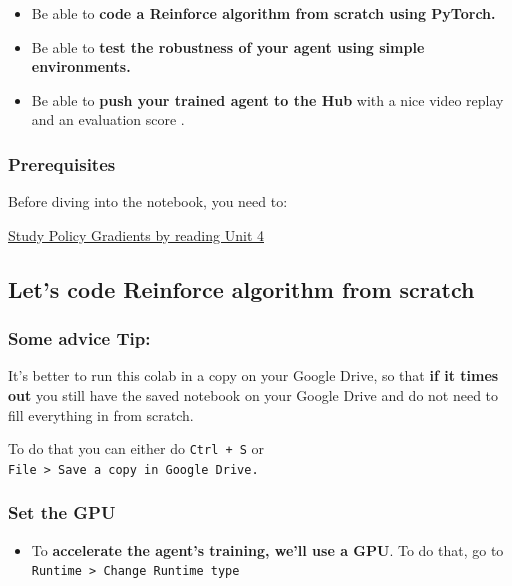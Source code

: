 \documentclass[11pt,a4paper]{article}
\begin{document}
\begin{itemize}
\tightlist
\item
  Be able to \textbf{code a Reinforce algorithm from scratch using PyTorch.}
\item
  Be able to \textbf{test the robustness of your agent using simple environments.}
\item
  Be able to \textbf{push your trained agent to the Hub} with a nice video replay and an evaluation score .
\end{itemize}

\subsubsection{Prerequisites}\label{prerequisites}

Before diving into the notebook, you need to:

\href{https://huggingface.co/deep-rl-course/unit4/introduction}{Study Policy Gradients by reading Unit 4}

\subsection{Let's code Reinforce algorithm from scratch}\label{lets-code-reinforce-algorithm-from-scratch}

\subsubsection{Some advice Tip:}\label{some-advice-tip}

It's better to run this colab in a copy on your Google Drive, so that \textbf{if it times out} you still have the saved notebook on your Google Drive and do not need to fill everything in from scratch.

To do that you can either do \texttt{Ctrl\ +\ S} or \texttt{File\ \textgreater{}\ Save\ a\ copy\ in\ Google\ Drive.}

\subsubsection{Set the GPU}\label{set-the-gpu}

\begin{itemize}
\tightlist
\item
  To \textbf{accelerate the agent's training, we'll use a GPU}. To do that, go to \texttt{Runtime\ \textgreater{}\ Change\ Runtime\ type}
\end{itemize}
\end{document}
